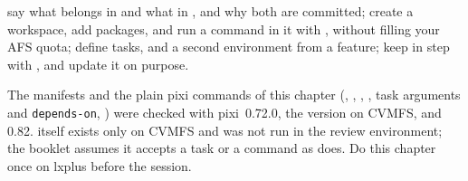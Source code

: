 \begin{levelcheck}
\begin{itemize}
  \can say what belongs in  and what in , and
       why both are committed;
  \can create a workspace, add packages, and run a command in it with
       , without filling your AFS quota;
  \can define tasks, and a second environment from a feature;
  \can keep  in step with , and update it
       on purpose.
\end{itemize}
\end{levelcheck}

\begin{solution}
The manifests and the plain pixi commands of this chapter (,
, , , task arguments and
\texttt{depends-on}, ) were checked with pixi~0.72.0, the version on
CVMFS, and 0.82.  itself exists only on CVMFS and was not
run in the review environment; the booklet assumes it accepts a task or a
command as  does. Do this chapter once on lxplus before the
session.
\end{solution}
